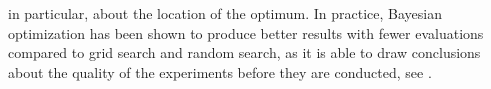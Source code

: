 in particular, about the location of the optimum. In practice, Bayesian optimization has been shown to produce better results with fewer evaluations compared to grid search and random search, as it is able to draw conclusions about the quality of the experiments before they are conducted, see \cite{SnoekLarochelleAdams:2012}.







